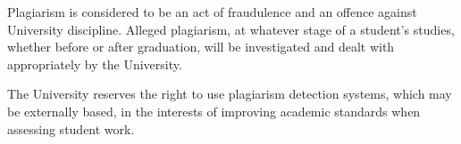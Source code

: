 \documentclass[a4paper,12pt]{article}
\begin{document}
Plagiarism is considered to be an act of fraudulence and an offence against University discipline. Alleged plagiarism, at whatever stage of a student's studies, whether before or after graduation, will be investigated and dealt with appropriately by the University.

The University reserves the right to use plagiarism detection systems, which may be externally based, in the interests of improving academic standards when assessing student work.
\end{document}
